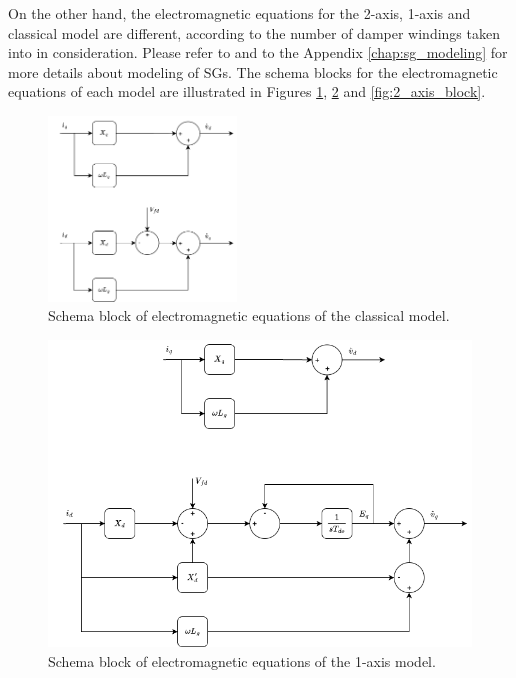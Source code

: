 On the other hand, the electromagnetic equations for the 2-axis, 1-axis and
classical model are different, according to the number of damper windings taken
into in consideration. Please refer to \cite{sauer2017power} and to the Appendix
\ref{chap:sg_modeling} for more details about modeling of SGs. The schema blocks
for the electromagnetic equations of each model are illustrated in Figures
\ref{fig:classical_block}, \ref{fig:1_axis_block} and \ref{fig:2_axis_block}.

\begin{figure}[ht!]
    \centering
    \includegraphics[width=5cm]{images/classical_block.png}
    \caption{Schema block of electromagnetic equations of the classical model.}
    \label{fig:classical_block}
\end{figure}

\newpage
\begin{figure}[ht!]
    \centering
    \includegraphics[width=12cm]{images/1_axis_block.png}
    \caption{Schema block of electromagnetic equations of the 1-axis model.}
    \label{fig:1_axis_block}
\end{figure}

